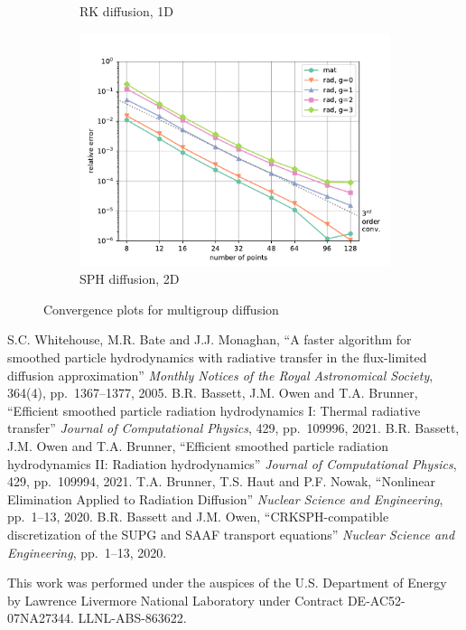 \documentclass[11pt]{article}
\begin{document}
\begin{figure}[htbp]
\begin{subfigure}{0.32\textwidth}
  \caption{RK diffusion, 1D}
  \label{fig:rk-conv}
\end{subfigure}
\hfill
\begin{subfigure}{0.32\textwidth}
  \includegraphics[width=\linewidth]{../figs/ManufacturedConvergenceRK1d}
  \caption{SPH diffusion, 2D}
  \label{fig:sph-conv-2d}
\end{subfigure}
\caption{Convergence plots for multigroup diffusion}
\end{figure}

\begin{thebibliography}{10}
 S.C. Whitehouse, M.R. Bate and J.J. Monaghan,
  ``A faster algorithm for smoothed particle hydrodynamics with radiative transfer in the flux-limited diffusion approximation''
  \textit{Monthly Notices of the Royal Astronomical Society}, 364(4), pp.~1367--1377, 2005.
 B.R. Bassett, J.M. Owen and T.A. Brunner,
  ``Efficient smoothed particle radiation hydrodynamics I: Thermal radiative transfer''
  \textit{Journal of Computational Physics}, 429, pp.~109996, 2021.
 B.R. Bassett, J.M. Owen and T.A. Brunner,
  ``Efficient smoothed particle radiation hydrodynamics II: Radiation hydrodynamics''
  \textit{Journal of Computational Physics}, 429, pp.~109994, 2021.
 T.A. Brunner, T.S. Haut and P.F. Nowak,
  ``Nonlinear Elimination Applied to Radiation Diffusion''
  \textit{Nuclear Science and Engineering}, pp.~1--13, 2020.
 B.R. Bassett and J.M. Owen,
  ``CRKSPH-compatible discretization of the SUPG and SAAF transport equations''
  \textit{Nuclear Science and Engineering}, pp.~1--13, 2020.
\end{thebibliography}

This work was performed under the auspices of the U.S. Department of Energy by Lawrence Livermore National Laboratory under Contract DE-AC52-07NA27344. LLNL-ABS-863622.
\end{document}
